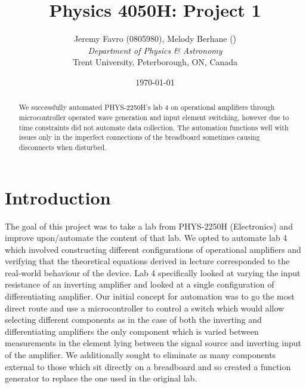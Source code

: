 \documentclass[10pt]{article}
\title{Physics 4050H: Project 1}
\author{Jeremy Favro (0805980), Melody Berhane () \\\emph{Department of Physics \& Astronomy}\\ Trent University, Peterborough, ON, Canada}
\date{\today}
\theoremstyle{definition}
\begin{document}
\maketitle
\listoftodos

\begin{abstract}
  We successfully automated PHYS-2250H's lab 4 on operational amplifiers through microcontroller operated
  wave generation and input element switching, however due to time constraints did not automate data collection.
  The automation functions well with issues only in the imperfect connections of the breadboard sometimes causing
  disconnects when disturbed.
\end{abstract}
\section{Introduction}
The goal of this project was to take a lab from PHYS-2250H (Electronics) and improve upon/automate the content of that lab. We opted to
automate lab 4 which involved constructing different configurations of operational amplifiers and verifying that the theoretical equations
derived in lecture corresponded to the real-world behaviour of the device. Lab 4 specifically looked at varying the input resistance of an
inverting amplifier and looked at a single configuration of differentiating amplifier. Our initial concept for automation was to go the most direct route
and use a microcontroller to control a switch which would allow selecting different components as in the case of both the inverting and differentiating amplifiers
the only component which is varied between measurements in the element lying between the signal source and inverting input of the amplifier. We additionally
sought to eliminate as many components external to those which sit directly on a breadboard and so created a function generator to replace the one used in the original lab.
\newpage
\end{document}
